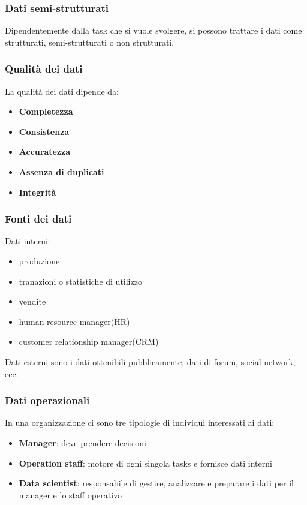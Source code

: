 \subsubsection{Dati semi-strutturati}
Dipendentemente dalla task che si vuole svolgere, si possono trattare i dati come
strutturati, semi-strutturati o non strutturati.


\subsubsection{Qualità dei dati}
La qualità dei dati dipende da:
\begin{itemize}
    \item \textbf{Completezza}
    \item \textbf{Consistenza}
    \item \textbf{Accuratezza}
    \item \textbf{Assenza di duplicati}
    \item \textbf{Integrità}
\end{itemize}

\subsubsection{Fonti dei dati}
Dati interni:
\begin{itemize}
    \item produzione
    \item tranazioni o statistiche di utilizzo
    \item vendite
    \item human resource manager(HR)
    \item customer relationship manager(CRM)
\end{itemize}

Dati esterni sono i dati ottenibili pubblicamente, dati di forum, social network, ecc.

\subsubsection{Dati operazionali}
In una organizzazione ci sono tre tipologie di individui interessati ai dati:
\begin{itemize}
    \item \textbf{Manager}: deve prendere decisioni
    \item \textbf{Operation staff}: motore di ogni singola tasks e fornisce dati interni
    \item \textbf{Data scientist}: responsabile di gestire, analizzare e preparare i dati per il manager e lo staff operativo
\end{itemize}

